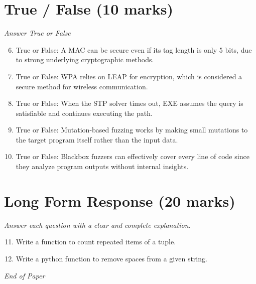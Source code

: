 \documentclass[12pt]{article}
\begin{document}
\section*{True / False (10 marks)}
\textit{Answer True or False}
\begin{enumerate}[label=\arabic*.]
\setcounter{enumi}{5}
\item True or False: A MAC can be secure even if its tag length is only 5 bits, due to strong underlying cryptographic methods.
\item True or False: WPA relies on LEAP for encryption, which is considered a secure method for wireless communication.
\item True or False: When the STP solver times out, EXE assumes the query is satisfiable and continues executing the path.
\item True or False: Mutation-based fuzzing works by making small mutations to the target program itself rather than the input data.
\item True or False: Blackbox fuzzers can effectively cover every line of code since they analyze program outputs without internal insights.
\end{enumerate}

\section*{Long Form Response (20 marks)}
\textit{Answer each question with a clear and complete explanation.}
\begin{enumerate}[label=\arabic*.]
\setcounter{enumi}{10}
\item Write a function to count repeated items of a tuple.
\item Write a python function to remove spaces from a given string.
\end{enumerate}

\vfill
\noindent\textit{End of Paper}
\end{document}
